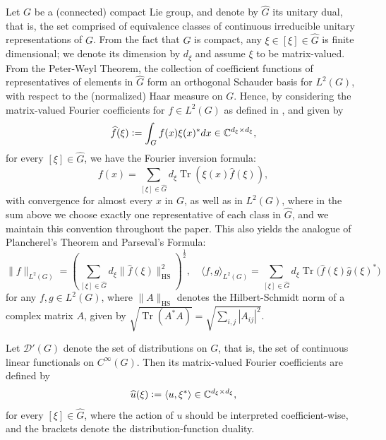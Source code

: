 \documentclass[11pt]{amsart}
\numberwithin{theorem}{section}
\numberwithin{equation}{section}
\theoremstyle{definition}
\numberwithin{example}{section}
\theoremstyle{definition}
\theoremstyle{definition}
\newcommand{\Tr}{\operatorname{Tr}}
\newcommand{\HS}{\operatorname{HS}}
\begin{document}
Let $G$ be a (connected) compact Lie group, and denote by $\widehat{G}$ its unitary dual, that is, the set comprised of equivalence classes of continuous irreducible unitary representations of $G$. From the fact that $G$ is compact, any $\xi\in [\xi]\in\widehat{G}$ is finite dimensional;  we denote its dimension by $d_\xi$ and assume $\xi$ to be matrix-valued. From the Peter-Weyl Theorem, the collection of coefficient functions of representatives of elements in $\widehat{G}$ form an orthogonal Schauder basis for $L^2(G)$, with respect to the (normalized) Haar measure on $G$. Hence, by considering the matrix-valued Fourier coefficients for $f\in L^2(G)$ as defined in \cite{RT2010_book}, and given by  
\begin{equation*}
    \widehat{f}(\xi)\vcentcolon= \int_G f(x)\xi(x)^*dx\in\mathbb{C}^{d_\xi\times d_\xi}, 
\end{equation*}
for every $ [\xi]\in\widehat{G}$, we have the Fourier inversion formula:
\begin{equation*}
    f(x)=\sum_{[\xi]\in\widehat{G}} d_\xi\Tr\left(\xi(x)\widehat{f}(\xi)\right),
\end{equation*}
with convergence for almost every $x$ in $G$, as well as in $L^2(G)$, where in the sum above we choose exactly one representative of each class in $\widehat{G}$, and we maintain this convention throughout the paper. This also yields the analogue of Plancherel's Theorem and Parseval's Formula:
\begin{equation}\label{eq_Plancherel}
    \|f\|_{L^2(G)}=\left(\sum_{[\xi]\in \widehat{G}}d_\xi\|\widehat{f}(\xi)\|_{\HS}^2\right)^{\frac{1}{2}},\quad \langle f,g\rangle_{L^2(G)}=\sum_{[\xi]\in\widehat{G}}d_\xi\Tr\Big(\widehat{f}(\xi)\widehat{g}(\xi)^*\Big)
\end{equation}
for any $f,g\in L^2(G)$, where $\|A\|_{\HS}$ denotes the Hilbert-Schmidt norm of a complex matrix $A$, given by $\sqrt{\Tr(A^*A)}=\sqrt{\sum_{i,j}|A_{ij}|^2}$. 

Let $\mathcal{D}'(G)$ denote the set of distributions on $G$, that is, the set of continuous linear functionals on $C^\infty(G)$. Then its matrix-valued  Fourier coefficients are defined by
\begin{equation*}
    \widehat{u}(\xi)\vcentcolon=\langle u,\xi^*\rangle\in\mathbb{C}^{d_\xi\times d_\xi},
\end{equation*}
for every $ [\xi]\in\widehat{G}$, where the action of $u$ should be interpreted  coefficient-wise, and the brackets denote the distribution-function duality.
\end{document}
